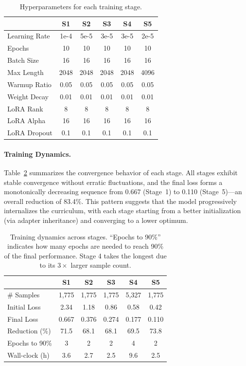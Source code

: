 ﻿\documentclass[journal]{IEEEtran}
\begin{document}
\begin{table}[!t]
\centering
\small
\begin{tabular}{lccccc}
\toprule
& \textbf{S1} & \textbf{S2} & \textbf{S3} & \textbf{S4} & \textbf{S5} \\
\midrule
Learning Rate & 1e-4 & 5e-5 & 3e-5 & 3e-5 & 2e-5 \\
Epochs & 10 & 10 & 10 & 10 & 10 \\
Batch Size & 16 & 16 & 16 & 16 & 16 \\
Max Length & 2048 & 2048 & 2048 & 2048 & 4096 \\
Warmup Ratio & 0.05 & 0.05 & 0.05 & 0.05 & 0.05 \\
Weight Decay & 0.01 & 0.01 & 0.01 & 0.01 & 0.01 \\
LoRA Rank & 8 & 8 & 8 & 8 & 8 \\
LoRA Alpha & 16 & 16 & 16 & 16 & 16 \\
LoRA Dropout & 0.1 & 0.1 & 0.1 & 0.1 & 0.1 \\
\bottomrule
\end{tabular}
\caption{Hyperparameters for each training stage.}
\label{tab:hyperparams}
\end{table}

\paragraph{Training Dynamics.}
Table~\ref{tab:training_dynamics} summarizes the convergence behavior of each stage. All stages exhibit stable convergence without erratic fluctuations, and the final loss forms a monotonically decreasing sequence from 0.667 (Stage~1) to 0.110 (Stage~5)---an overall reduction of 83.4\%. This pattern suggests that the model progressively internalizes the curriculum, with each stage starting from a better initialization (via adapter inheritance) and converging to a lower optimum.

\begin{table}[!t]
\centering
\small
\begin{tabular}{lccccc}
\toprule
& \textbf{S1} & \textbf{S2} & \textbf{S3} & \textbf{S4} & \textbf{S5} \\
\midrule
\# Samples & 1,775 & 1,775 & 1,775 & 5,327 & 1,775 \\
Initial Loss & 2.34 & 1.18 & 0.86 & 0.58 & 0.42 \\
Final Loss & 0.667 & 0.376 & 0.274 & 0.177 & 0.110 \\
Reduction (\%) & 71.5 & 68.1 & 68.1 & 69.5 & 73.8 \\
Epochs to 90\% & 3 & 2 & 2 & 4 & 2 \\
Wall-clock (h) & 3.6 & 2.7 & 2.5 & 9.6 & 2.5 \\
\bottomrule
\end{tabular}
\caption{Training dynamics across stages. ``Epochs to 90\%'' indicates how many epochs are needed to reach 90\% of the final performance. Stage 4 takes the longest due to its $3\times$ larger sample count.}
\label{tab:training_dynamics}
\end{table}
\end{document}
